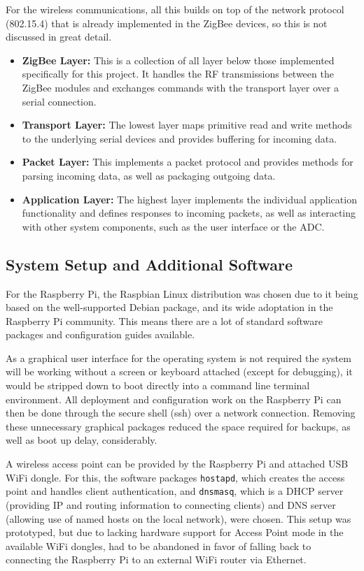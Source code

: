 For the wireless communications, all this builds on top of the network protocol (802.15.4) that is already implemented in the ZigBee devices, so this is not discussed in great detail.

\begin{itemize}
	\item \textbf{ZigBee Layer:} This is a collection of all layer below those implemented specifically for this project. It handles the RF transmissions between the ZigBee modules and exchanges commands with the transport layer over a serial connection.
	\item \textbf{Transport Layer:} The lowest layer maps primitive read and write methods to the underlying serial devices and provides buffering for incoming data.
	\item \textbf{Packet Layer:} This implements a packet protocol and provides methods for parsing incoming data, as well as packaging outgoing data.
	\item \textbf{Application Layer:} The highest layer implements the individual application functionality and defines responses to incoming packets, as well as interacting with other system components, such as the user interface or the ADC.
\end{itemize}

\subsection{System Setup and Additional Software}
For the Raspberry Pi, the Raspbian Linux\cite{raspbian} distribution was chosen due to it being based on the well-supported Debian package, and its wide adoptation in the Raspberry Pi community. This means there are a lot of standard software packages and configuration guides available.

As a graphical user interface for the operating system is not required the system will be working without a screen or keyboard attached (except for debugging), it would be stripped down to boot directly into a command line terminal environment. All deployment and configuration work on the Raspberry Pi can then be done through the secure shell (ssh) over a network connection. Removing these unnecessary graphical packages reduced the space required for backups, as well as boot up delay, considerably.

A wireless access point can be provided by the Raspberry Pi and attached USB WiFi dongle. For this, the software packages \texttt{hostapd}\cite{hostapd}, which creates the access point and handles client authentication, and \texttt{dnsmasq}\cite{dnsmasq}, which is a DHCP server (providing IP and routing information to connecting clients) and DNS server (allowing use of named hosts on the local network), were chosen. This setup was prototyped, but due to lacking hardware support for Access Point mode in the available WiFi dongles, had to be abandoned in favor of falling back to connecting the Raspberry Pi to an external WiFi router via Ethernet.
